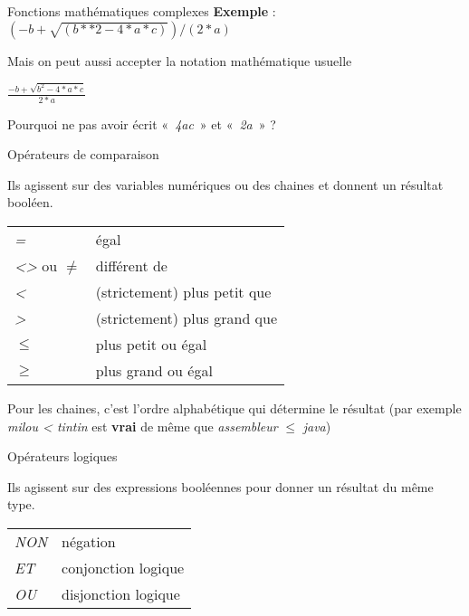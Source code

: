 \begin{frame}{Fonctions mathématiques complexes}
	\textbf{Exemple} : 
	$(-b+\sqrt{(b\ast \ast 2-4\ast a\ast c)})/(2\ast a)$
	
	\bigskip
	
	Mais on peut aussi accepter la notation mathématique usuelle
	\begin{center}
	$\frac{-b+\sqrt{b^{2}-4\ast a\ast c}}{2\ast a}$ 
	\end{center}
	
	\bigskip

	Pourquoi ne pas avoir écrit «~\textit{4ac}~» et
	«~\textit{2a}~» ?
\end{frame}

\begin{frame}{Opérateurs de comparaison}

	Ils agissent sur des variables numériques ou des
	chaines et donnent un résultat booléen.

	\bigskip

	\begin{tabular}{p{1.6cm}|p{11.5cm}}
	\raggedleft  \textit{=} & égal\\
	\raggedleft  \textit{{\textless}{\textgreater}}
		ou \textit{${\neq}$} &  différent de\\
	\raggedleft  \textit{\textless} & (strictement) plus petit que\\
	\raggedleft  \textit{\textgreater} & (strictement) plus grand que\\
	\raggedleft  \textit{${\leq}$} & plus petit ou égal\\
	\raggedleft  \textit{${\geq}$} & plus grand ou égal\\
	\end{tabular}
	
	\bigskip

	Pour les chaines, c'est l’ordre alphabétique qui
	détermine le résultat (par exemple
	\textit{{\textquotedbl}milou{\textquotedbl} {\textless}
	{\textquotedbl}tintin{\textquotedbl}} est \textbf{vrai} de même que
	\textit{{\textquotedbl}assembleur{\textquotedbl}
	}\textit{${\leq}$}\textit{
	{\textquotedbl}java{\textquotedbl}})
	
\end{frame}
	
\begin{frame}{Opérateurs logiques}

	Ils agissent sur des expressions booléennes 
	pour donner un résultat du même type.
	
	\bigskip

	\begin{tabular}{p{1.6cm}|p{11.5cm}}
	\raggedleft  \textit{NON} & négation\\
	\raggedleft  \textit{ET} & conjonction logique\\
	\raggedleft  \textit{OU} & disjonction logique\\
	\end{tabular}
\end{frame}


